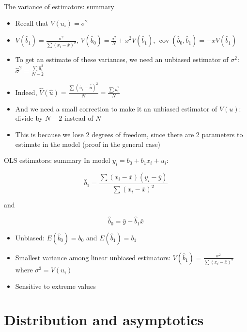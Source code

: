 \documentclass[aspectratio=169]{beamer}
\begin{document}
\begin{frame}{The variance of estimators: summary}
\begin{itemize}
    \item Recall that $V(u_i) = \sigma^2$
    \item $V(\hat{b}_1) = \frac{\sigma^2}{\sum(x_i - \bar{x})^2}$, \quad $V(\hat{b}_0) = \frac{\sigma^2}{N} + \bar{x}^2 V(\hat{b}_1)$, \quad $\operatorname{cov}(\hat{b}_0, \hat{b}_1) = -\bar{x}V(\hat{b}_1)$
    \item To get an estimate of these variances, we need an unbiased estimator of $\sigma^2$: $\hat{\sigma}^2 = \frac{\sum \hat{u}_i^2}{N - 2}$
    \item Indeed, $\hat{V}(\hat{u}) = \frac{\sum(\hat{u}_i - \bar{\hat{u}})^2}{N} = \frac{\sum \hat{u}_i^2}{N}$
    \item And we need a small correction to make it an unbiased estimator of $V(u)$: divide by $N - 2$ instead of $N$
    \item This is because we lose 2 degrees of freedom, since there are 2 parameters to estimate in the model (proof in the general case)
\end{itemize}
\end{frame}

\begin{frame}{OLS estimators: summary}
In model $y_i = b_0 + b_1x_i + u_i$:

\[\hat{b}_1 = \frac{\sum(x_i - \bar{x})(y_i - \bar{y})}{\sum(x_i - \bar{x})^2}\]

and

\[\hat{b}_0 = \bar{y} - \hat{b}_1\bar{x}\]

\begin{itemize}
    \item Unbiased: $E(\hat{b}_0) = b_0$ and $E(\hat{b}_1) = b_1$
    \item Smallest variance among linear unbiased estimators: $V(\hat{b}_1) = \frac{\sigma^2}{\sum(x_i - \bar{x})^2}$ where $\sigma^2 = V(u_i)$
    \item Sensitive to extreme values
\end{itemize}
\end{frame}

\section{Distribution and asymptotics}
\end{document}
